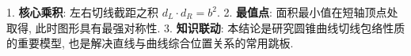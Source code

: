 \begin{summarybox}
1. \textbf{核心乘积}: 左右切线截距之积 $d_L \cdot d_R = b^2$.
2. \textbf{最值点}: 面积最小值在短轴顶点处取得, 此时图形具有最强对称性.
3. \textbf{知识联动}: 本结论是研究圆锥曲线切线包络性质的重要模型, 也是解决直线与曲线综合位置关系的常用跳板.
\end{summarybox}
